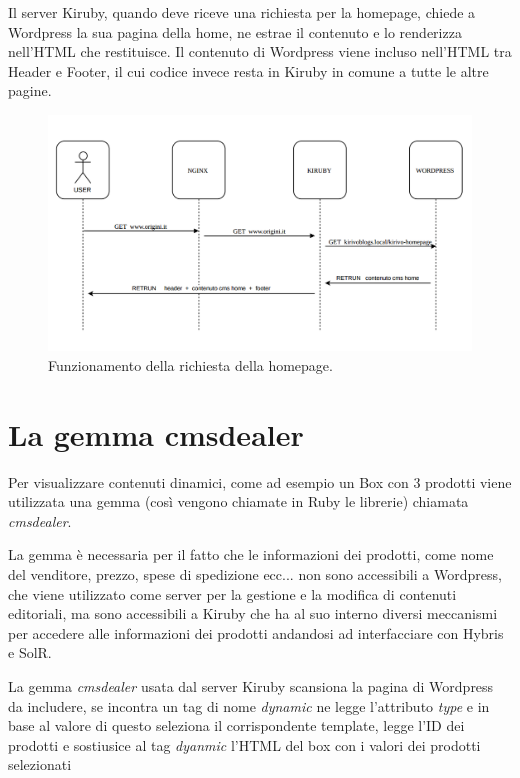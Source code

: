 \newpage

Il server Kiruby, quando deve riceve una richiesta per la homepage, chiede a Wordpress la sua pagina della home, ne estrae
il contenuto e lo renderizza nell'HTML che restituisce. Il contenuto di Wordpress viene incluso nell'HTML tra Header e Footer, il cui codice invece resta in Kiruby in comune a tutte le altre pagine.


\begin{figure}
  \includegraphics[width=\textwidth]{figure/homeseq.png}
  \caption{Funzionamento della richiesta della homepage.}
  \label{fig:homeseq}
\end{figure}



\section{La gemma cmsdealer}
Per visualizzare contenuti dinamici, come ad esempio un Box con 3 prodotti viene utilizzata
una gemma (così vengono chiamate in Ruby le librerie) chiamata \emph{cmsdealer}.

La gemma è necessaria per il fatto che le informazioni dei prodotti, come nome del venditore, prezzo, spese di spedizione ecc... non sono accessibili a Wordpress, che viene utilizzato
come server per la gestione e la modifica di contenuti editoriali, ma sono accessibili a Kiruby che ha al suo interno diversi
meccanismi per accedere alle informazioni dei prodotti andandosi ad interfacciare con Hybris e SolR.

La gemma \emph{cmsdealer} usata dal server Kiruby scansiona la pagina di Wordpress da includere,
se incontra un tag di nome \emph{dynamic} ne legge l'attributo \emph{type} e in base al valore di questo
seleziona il corrispondente template, legge l'ID dei prodotti e sostiusice al tag \emph{dyanmic} l'HTML del box con
i valori dei prodotti selezionati

